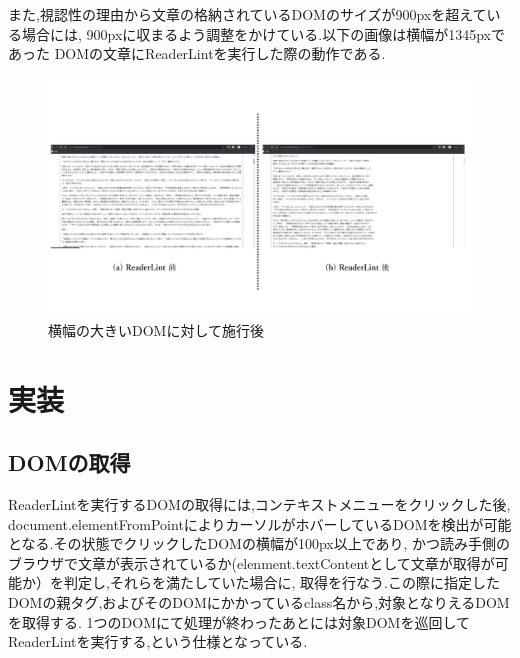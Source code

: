 また,視認性の理由から文章の格納されているDOMのサイズが900pxを超えている場合には,
900pxに収まるよう調整をかけている.以下の画像は横幅が1345pxであった
DOMの文章にReaderLintを実行した際の動作である.\footnotemark[1]


\begin{figure}[H]
    \centering
    \label{fig:image12}
    \includegraphics[width=0.8\columnwidth]{image/03/img8.png}
	\caption[幅の大きいDOMに対して施行後]{横幅の大きいDOMに対して施行後}
\end{figure}

\section{実装}

\subsection{DOMの取得}
ReaderLintを実行するDOMの取得には,コンテキストメニューをクリックした後,
document.elementFromPointによりカーソルがホバーしているDOMを検出が可能となる.その状態でクリックしたDOMの横幅が100px以上であり,
かつ読み手側のブラウザで文章が表示されているか(elenment.textContentとして文章が取得が可能か）を判定し,それらを満たしていた場合に,
取得を行なう.この際に指定したDOMの親タグ,およびそのDOMにかかっているclass名から,対象となりえるDOMを取得する.
1つのDOMにて処理が終わったあとには対象DOMを巡回してReaderLintを実行する,という仕様となっている.

